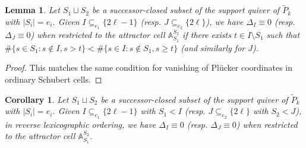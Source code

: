 \documentclass{amsart}
\newtheorem{corollary}[theorem]{Corollary}
\newtheorem{lemma}[theorem]{Lemma}
\numberwithin{equation}{section}
\renewcommand{\AA}{\mathbb{A}}
\begin{document}
  \begin{lemma}
    Let $S_1\sqcup S_2$ be a successor-closed subset of the support quiver of $\tilde P_k$ with $|S_i|=e_i$.
    Given $I \subseteq_{e_1} \{2\ell-1\}$ (resp. $J \subseteq_{e_2} \{2\ell\}$), we have $\Delta_I\equiv 0$ (resp. $\Delta_J\equiv 0$) when restricted to the attractor cell $\AA_{S_1}^{S_2}$ if there exists $t\in I\setminus S_1$ such that $\#\{s\in S_1:s\notin I, s>t\} < \#\{s\in I:s\notin S_1, s \ge t\}$ (and similarly for $J$).
  \end{lemma}
  \begin{proof}
    This matches the same condition for vanishing of Pl\"ucker coordinates in ordinary Schubert cells.
  \end{proof}
  \begin{corollary}
    Let $S_1\sqcup S_2$ be a successor-closed subset of the support quiver of $\tilde P_k$ with $|S_i|=e_i$.
    Given $I \subseteq_{e_1} \{2\ell-1\}$ with $S_1<I$ (resp. $J \subseteq_{e_2} \{2\ell\}$ with $S_2<J$), in reverse lexicographic ordering, we have $\Delta_I \equiv 0$ (resp. $\Delta_J\equiv 0$) when restricted to the attractor cell $\AA_{S_1}^{S_2}$.
  \end{corollary}
\end{document}
